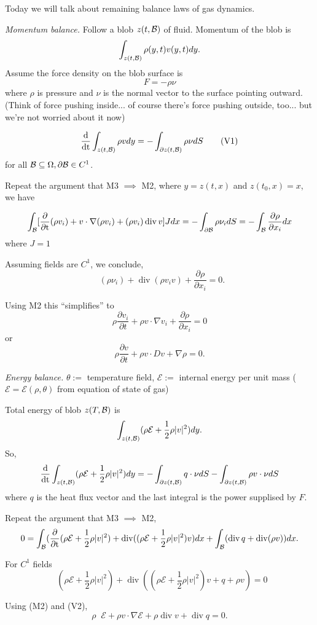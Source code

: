 \documentclass[11pt]{amsart}%
\newcommand\cE{\mathcal{E}}
\DeclareMathOperator{\dt}{\frac{d}{dt}}
\DeclareMathOperator{\pt}{\frac{\partial}{\partial t}}
\DeclareMathOperator{\dive}{div}
\begin{document}
Today we will talk about remaining balance laws of gas dynamics.

\emph{Momentum balance.} Follow a blob $z(t,\mathcal{B})$ of fluid. Momentum of the blob is
$$\int_{z(t,\mathcal{B})} \rho(y,t)v(y,t)dy.$$
 Assume the force density on the blob surface is
 $$F=-\rho \nu$$ where $\rho$ is pressure and $\nu$ is the normal vector to the surface pointing outward. (Think of force pushing inside... of course there's force pushing outside, too... but we're not worried about it now)
 
 \[ \dt \int_{z(t,\cB)} \rho v dy = -\int_{\partial z(t,\cB)} \rho \nu dS \tag{V1}\] for all $\mathcal{B}\subseteq \Omega, \partial \mathcal{B} \in C^1$.

Repeat the argument that M3 $\implies$ M2, where $y=z(t,x)$ and $z(t_0,x)=x$, we have

$$\int_{\cB} [\pt (\rho v_i)+ v\cdot\nabla(\rho v_i) + (\rho v_i) \dive v]J dx=-\int_{\partial \cB} \rho \nu_i dS = -\int_{\cB} \frac{\partial \rho}{\partial x_i} dx$$ where $J=1$

Assuming fields are $C^1$, we conclude,
\[ \pt(\rho \nu_i) + \dive(\rho v_i v) + \frac{\partial \rho}{\partial x_i} =0 \tag{V2-}.\]

Using M2 this ``simplifies'' to
$$\rho \frac{\partial v_i}{\partial t} +\rho v\cdot \nabla{v_i} + \frac{\partial \rho}{\partial x_i}=0$$
or 
\[ \rho\frac{\partial v}{\partial t} + \rho v\cdot Dv + \nabla \rho =0.\tag{V2}\]

\emph{Energy balance.} $\theta :=$ temperature field, $\cE:=$ internal energy per unit mass ($\cE =\cE(\rho,\theta)$ from equation of state of gas)

Total energy of blob $z(T,\mathcal{B})$ is
$$\int_{z(t,\cB)}(\rho \cE + \frac{1}{2}\rho\vert v\vert^2)dy.$$
So,
$$\dt\int_{z(t,\cB)}(\rho \cE +\frac{1}{2}\rho\vert v\vert^2)dy = -\int_{\partial z(t,\cB)} q\cdot \nu dS -\int_{\partial z(t,\cB)} \rho v\cdot \nu dS$$ where $q$ is the heat flux vector and the last integral is the power supplised by $F$.

Repeat the argument that M3 $\implies$ M2,
$$0=\int_{\cB} (\pt (\rho \cE +\frac{1}{2} \rho \vert v\vert ^2) + \dive((\rho\cE+\frac{1}{2}\rho\vert v\vert^2)v)dx + \int_{\cB} (\dive q + \dive(\rho v))dx.$$

For $C^1$ fields
\[\pt(\rho \cE +\frac{1}{2}\rho\vert v\vert^2)+\dive((\rho\cE +\frac{1}{2}\rho\vert v\vert^2) v + q +\rho v)=0 \tag{E2-}\]

Using (M2) and (V2),
\[\rho \pt \cE + \rho v\cdot \nabla \cE +\rho \dive v +\dive q =0.\tag{E3}\]
\end{document}
